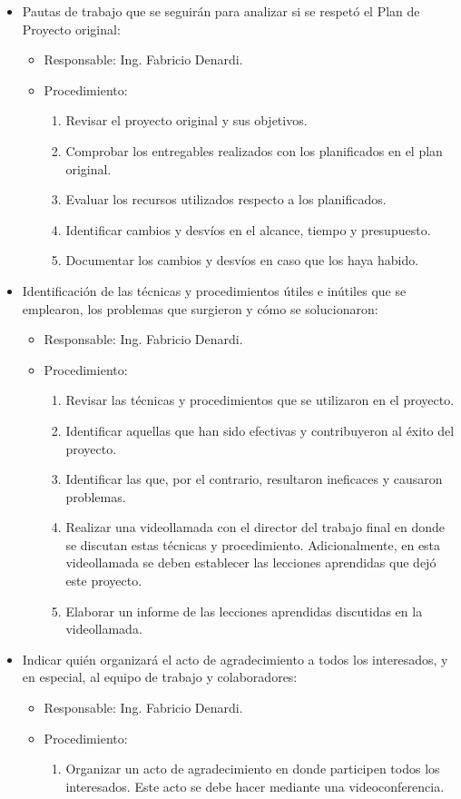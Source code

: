\documentclass[
11pt, %
]{charter}
\begin{document}
\begin{itemize}
	\item Pautas de trabajo que se seguirán para analizar si se respetó el Plan de Proyecto original:
	 \begin{itemize}
	 \item Responsable: Ing. Fabricio Denardi.
	 \item Procedimiento:
	 \begin{enumerate}
	 	\item Revisar el proyecto original y sus objetivos.
	 	\item Comprobar los entregables realizados con los planificados en el plan original.
	 	\item Evaluar los recursos utilizados respecto a los planificados.
	 	\item Identificar cambios y desvíos en el alcance, tiempo y presupuesto.
	 	\item Documentar los cambios y desvíos en caso que los haya habido. 	
	 \end{enumerate}
	 \end{itemize}
	\item Identificación de las técnicas y procedimientos útiles e inútiles que se emplearon, los problemas que surgieron y cómo se solucionaron:
	\begin{itemize}
	 \item Responsable: Ing. Fabricio Denardi.
	 \item Procedimiento:
	 \begin{enumerate}
	 	\item Revisar las técnicas y procedimientos que se utilizaron en el proyecto.
	 	\item Identificar aquellas que han sido efectivas y contribuyeron al éxito del proyecto.
	 	\item Identificar las que, por el contrario, resultaron ineficaces y causaron problemas.
	 	\item Realizar una videollamada con el director del trabajo final en donde se discutan estas técnicas y procedimiento. Adicionalmente, en esta videollamada se deben establecer las lecciones aprendidas que dejó este proyecto.
	 	\item Elaborar un informe de las lecciones aprendidas discutidas en la videollamada.
	 \end{enumerate}
	 
	 \end{itemize}
	\item Indicar quién organizará el acto de agradecimiento a todos los interesados, y en especial, al equipo de trabajo y colaboradores:
	 \begin{itemize}
	 \item Responsable: Ing. Fabricio Denardi.
	 \item Procedimiento:
	 \begin{enumerate}
	 	\item Organizar un acto de agradecimiento en donde participen todos los interesados. Este acto se debe hacer mediante una videoconferencia.
	 \end{enumerate}
	 

\end{itemize}
\end{itemize}
\end{document}

